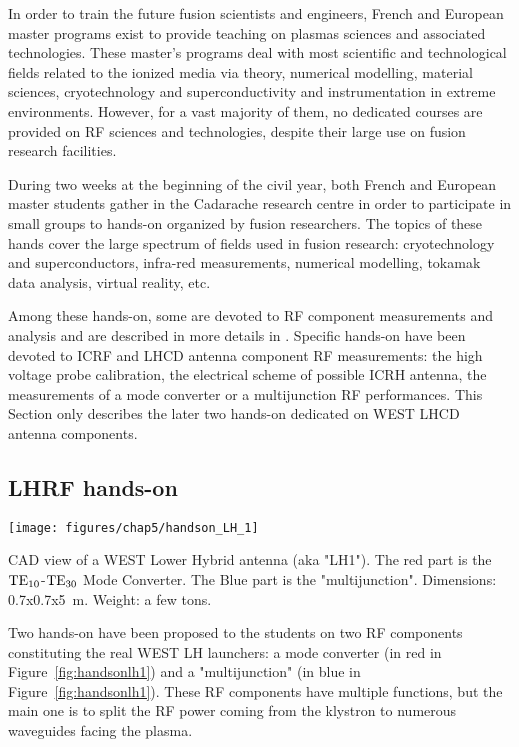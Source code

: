In order to train the future fusion scientists and engineers, French and European master programs exist to provide teaching on plasmas sciences and associated technologies. These master's programs deal with most scientific and technological fields related to the ionized media via theory, numerical modelling, material sciences, cryotechnology and superconductivity and instrumentation in extreme environments. However, for a vast majority of them, no dedicated courses are provided on RF sciences and technologies, despite their large use on fusion research facilities. 

During two weeks at the beginning of the civil year, both French and European master students gather in the Cadarache research centre in order to participate in small groups to hands-on organized by fusion researchers. The topics of these hands cover the large spectrum of fields used in fusion research: cryotechnology and superconductors, infra-red measurements, numerical modelling, tokamak data analysis, virtual reality, etc. 

Among these hands-on, some are devoted to RF component measurements and analysis and are described in more details in . Specific hands-on have been devoted to ICRF and LHCD antenna component RF measurements: the high voltage probe calibration, the electrical scheme of possible ICRH antenna, the measurements of a mode converter or a multijunction RF performances. This Section only describes the later two hands-on dedicated on WEST LHCD antenna components. 

\subsection{LHRF hands-on}

\begin{marginfigure}
	\centering
	\texttt{[image: figures/chap5/handson\_LH\_1]}
	\caption{CAD view of a WEST Lower Hybrid antenna (aka "LH1"). The red part is the ${\mathrm{TE}}_{10}$-${\mathrm{TE}}_{30}$ Mode Converter. The Blue part is the "multijunction". Dimensions: 0.7x0.7x5~m. Weight: a few tons. }
	\label{fig:handsonlh1}
\end{marginfigure}

Two hands-on have been proposed to the students on two RF components constituting the real WEST LH launchers: a mode converter (in red in Figure~\ref{fig:handsonlh1}) and a "multijunction" (in blue in Figure~\ref{fig:handsonlh1}). These RF components have multiple functions, but the main one is to split the RF power coming from the klystron to numerous waveguides facing the plasma. 

